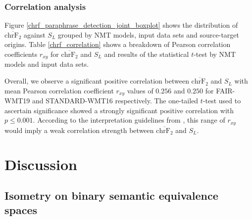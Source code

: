 \documentclass[11pt,a4paper]{article}
\begin{document}
\subsubsection{Correlation analysis}

Figure \ref{chrf_paraphrase_detection_joint_boxplot} shows the distribution of
$\overline{\text{chrF}_2}$ against $S_L$ grouped by NMT models, input data sets
and source-target origins. Table \ref{chrf_correlation} shows a breakdown of
Pearson correlation coefficients $r_{xy}$ for $\overline{\text{chrF}_2}$ and
$S_L$ and results of the statistical $t$-test by NMT models and input data sets.

Overall, we observe a significant positive correlation between
$\overline{\text{chrF}_2}$ and $S_L$ with mean Pearson correlation coefficient
$r_{xy}$ values of $0.256$ and $0.250$ for FAIR-WMT19 and STANDARD-WMT16
respectively. The one-tailed $t$-test used to ascertain significance showed a
strongly significant positive correlation with $p\leq0.001$. According to the
interpretation guidelines from \citet{schober2018correlation}, this range of
$r_{xy}$ would imply a weak correlation strength between
$\overline{\text{chrF}_2}$ and $S_L$.

\section{Discussion}

\subsection{Isometry on binary semantic equivalence spaces}
\end{document}
